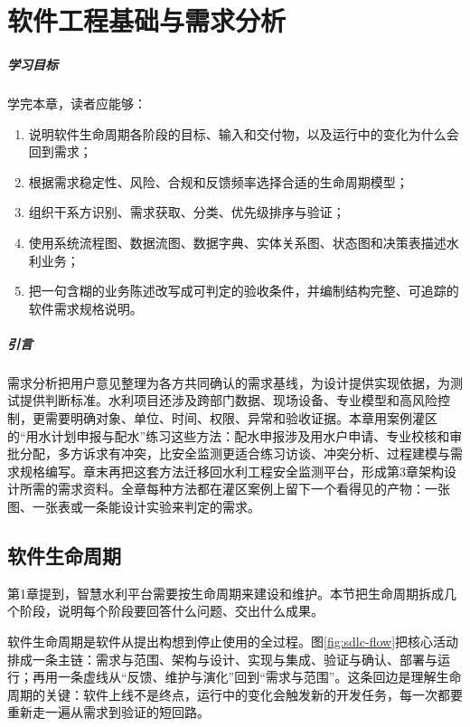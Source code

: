 \chapter{软件工程基础与需求分析}

\paragraph*{学习目标}

学完本章，读者应能够：

\begin{enumerate}
\item 说明软件生命周期各阶段的目标、输入和交付物，以及运行中的变化为什么会回到需求；
\item 根据需求稳定性、风险、合规和反馈频率选择合适的生命周期模型；
\item 组织干系方识别、需求获取、分类、优先级排序与验证；
\item 使用系统流程图、数据流图、数据字典、实体关系图、状态图和决策表描述水利业务；
\item 把一句含糊的业务陈述改写成可判定的验收条件，并编制结构完整、可追踪的软件需求规格说明。
\end{enumerate}

\paragraph*{引言}

需求分析把用户意见整理为各方共同确认的需求基线，为设计提供实现依据，为测试提供判断标准。水利项目还涉及跨部门数据、现场设备、专业模型和高风险控制，更需要明确对象、单位、时间、权限、异常和验收证据。本章用案例灌区的“用水计划申报与配水”练习这些方法：配水申报涉及用水户申请、专业校核和审批分配，多方诉求有冲突，比安全监测更适合练习访谈、冲突分析、过程建模与需求规格编写。章末再把这套方法迁移回水利工程安全监测平台，形成第3章架构设计所需的需求资料。全章每种方法都在灌区案例上留下一个看得见的产物：一张图、一张表或一条能设计实验来判定的需求。

\section{软件生命周期}

第1章提到，智慧水利平台需要按生命周期来建设和维护。本节把生命周期拆成几个阶段，说明每个阶段要回答什么问题、交出什么成果。

软件生命周期是软件从提出构想到停止使用的全过程\cite{ISO12207,sommerville2015,bourque2014,zhang2013}。图\ref{fig:sdlc-flow}把核心活动排成一条主链：需求与范围、架构与设计、实现与集成、验证与确认、部署与运行；再用一条虚线从“反馈、维护与演化”回到“需求与范围”。这条回边是理解生命周期的关键：软件上线不是终点，运行中的变化会触发新的开发任务，每一次都要重新走一遍从需求到验证的短回路。

